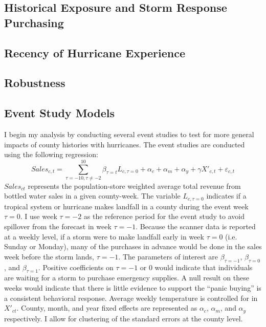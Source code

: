\documentclass{article}
\begin{document}
\subsection{Historical Exposure and Storm Response Purchasing}

\subsection{Recency of Hurricane Experience}

\subsection{Robustness}

\subsection{Event Study Models}

I begin my analysis by conducting several event studies to test for more general impacts of county histories with hurricanes. The event studies are conducted using the following regression: 
\begin{equation}
Sales_{c,t} = \sum_{\tau = -10, \tau \neq -2}^{10} \beta_{\tau = t}L_{c,\tau = 0} + \alpha_c + \alpha_m + \alpha_y + \gamma X'_{c,t} + \varepsilon_{c,t}
\label{eq:ES}
\end{equation}
$Sales_{ct}$ represents the population-store weighted average total revenue from bottled water sales in a given county-week. The variable $L_{c, \tau = 0}$ indicates if a tropical system or hurricane makes landfall in a county during the event week $\tau = 0$. I use week $\tau = -2$ as the reference period for the event study to avoid spillover from the forecast in week $\tau = -1$. Because the scanner data is reported at a weekly level, if a storm were to make landfall early in week $\tau=0$ (i.e. Sunday or Monday), many of the purchases in advance would be done in the sales week before the storm lands, $\tau=-1$. The parameters of interest are $\beta_{\tau = -1}$, $\beta_{\tau = 0}$, and $\beta_{\tau = 1}$. Positive coefficients on $\tau = -1$ or $0$ would indicate that individuals are waiting for a storm to purchase emergency supplies. A null result on these weeks would indicate that there is little evidence to support the ``panic buying'' is a consistent behavioral response. Average weekly temperature is controlled for in $X'_{ct}$. County, month, and year fixed effects are represented as $\alpha_c$, $\alpha_m$, and $\alpha_y$ respectively. I allow for clustering of the standard errors at the county level.
\end{document}
